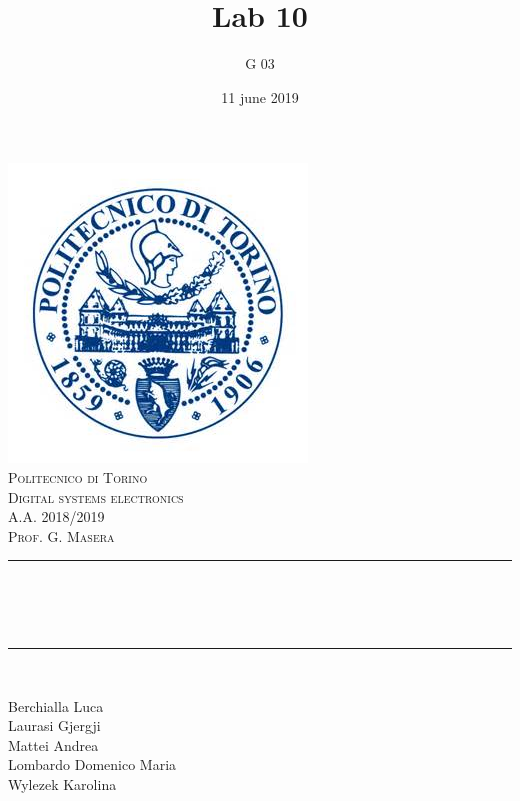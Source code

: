 \documentclass[12pt]{article}
\title{Lab 10}													%
\author{G 03}														%
\date{11 june 2019}														%
\makeatletter
\let\thetitle\@title
\let\thedate\@date
\makeatother
\begin{document}

\begin{titlepage}
	\centering
    \vspace*{0.5 cm}
    \includegraphics[scale = 0.75]{polito.jpg}\\[1.0 cm]				%
    \textsc{\LARGE Politecnico di Torino}\\[2.0 cm]						%
	\textsc{\Large Digital systems electronics\\ A.A. 2018/2019}\\[0.5 cm]		%
	\textsc{\Large Prof. G. Masera}\\[0.5 cm]		%
	\rule{\linewidth}{0.2 mm} \\[0.4 cm]
	{ \huge \bfseries \thetitle \\ \small \thedate}\\
	\rule{\linewidth}{0.2 mm} \\[1.5 cm]
	
	\begin{minipage}{0.4\textwidth}
		\begin{flushleft} \large
			Berchialla Luca\\												%
			Laurasi Gjergji
			\\
			
			Mattei Andrea\\
            Lombardo Domenico Maria\\
            Wylezek Karolina
            
			\end{flushleft}
			\end{minipage}~
			\begin{minipage}{0.4\textwidth}
            

\end{minipage}
\end{titlepage}
\end{document}
